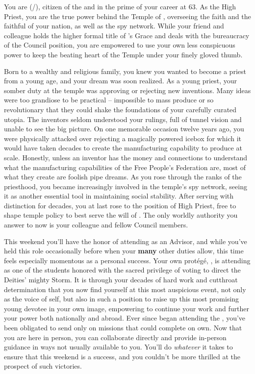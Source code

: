 \documentclass[char]{GL2020}
\begin{document}
\name{\cAntiChup{}}

You are \cAntiChup{\full} (\cAntiChup{\they}/\cAntiChup{\them}), citizen of the \pTech{} and in the prime of your career at 63.  As the High Priest, you are the true power behind the Temple of \cTechGod{}, overseeing the faith and the faithful of your nation, as well as the \pTech{} spy network. While your friend and colleague \cCouncilPriest{} holds the higher formal title of \cTechGod{}'s Grace and deals with the bureaucracy of the Council position, you are empowered to use your own less conspicuous power to keep the beating heart of the Temple under your finely gloved thumb. 

Born to a wealthy and religious family, you knew you wanted to become a priest from a young age, and your dream was soon realized. As a young priest, your somber duty at the temple was approving or rejecting new inventions. Many ideas were too grandiose to be practical – impossible to mass produce or so revolutionary that they could shake the foundations of your carefully curated utopia. The inventors seldom understood your rulings, full of tunnel vision and unable to see the big picture. On one memorable occasion twelve years ago, you were physically attacked over rejecting a magically powered icebox for which it would have taken decades to create the manufacturing capability to produce at scale. Honestly, unless an inventor has the money and connections to understand what the manufacturing capabilities of the Free People's Federation are, most of what they create are foolish pipe dreams. As you rose through the ranks of the priesthood, you became increasingly involved in the temple's spy network, seeing it as another essential tool in maintaining social stability. After serving with distinction for decades, you at last rose to the position of High Priest, free to shape temple policy to best serve the will of \cTechGod{}. The only worldly authority you answer to now is your colleague \cCouncilPriest{} and \cCouncilPriest{\their} fellow Council members.

This weekend you'll have the honor of attending \pSchool{} as an Advisor, and while you've held this role occasionally before when your \textbf{many} other duties allow, this time feels especially momentous as a personal success. Your own protégé, \cScholarship{\full}, is attending as one of the students honored with the sacred privilege of voting to direct the Deities' mighty Storm. It is through your decades of hard work and cutthroat determination that you now find yourself at this most auspicious event, not only as the voice of \cTechGod{} \cTechGod{\them}self, but also in such a position to raise up this most promising young devotee in your own image, empowering \cScholarship{\them} to continue your work and further your power both nationally and abroad. Ever since \cScholarship{} began attending the \pSchool{}, you've been obligated to send \cScholarship{\them} only on missions that \cScholarship{\they} could complete on  \cScholarship{\their} own. Now that you are here in person, you can collaborate directly and provide in-person guidance in ways not usually available to you. You'll do \emph{whatever} it takes to ensure that this weekend is a success, and you couldn't be more thrilled at the prospect of such victories. 
\end{document}
